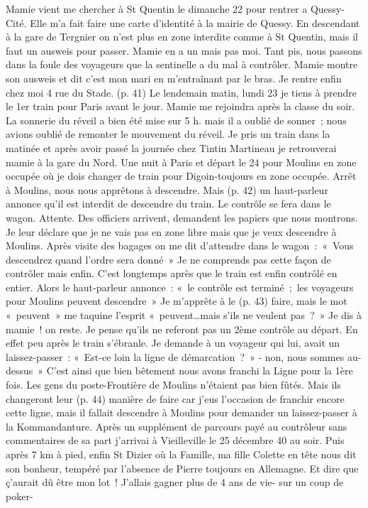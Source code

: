 \documentclass[a5paper,pagesize,10pt,bibtotoc,pointlessnumbers,
normalheadings,DIV=9,twoside=false]{scrbook}
\begin{document}
	Mamie vient me chercher à St Quentin le dimanche 22 pour rentrer a Quessy-Cité. Elle m’a fait faire une carte d’identité à la mairie de Quessy. En descendant à la gare de Tergnier on n’est plus en zone interdite comme à St Quentin, mais il faut un ausweis pour passer. Mamie en a un mais pas moi. Tant pis, nous passons dans la foule des voyageurs que la sentinelle a du mal à contrôler. Mamie montre son ausweis et dit c’est mon mari en m’entraînant par le bras. Je rentre enfin chez moi 4 rue du Stade.
	(p. 41) Le lendemain matin, lundi 23 je tiens à prendre le 1er train pour Paris avant le jour. Mamie me rejoindra après la classe du soir. La sonnerie du réveil a bien été mise sur 5 h. mais il a oublié de sonner ; nous avions oublié de remonter le mouvement du réveil. Je pris un train dans la matinée et après avoir passé la journée chez Tintin Martineau je retrouverai mamie à la gare du Nord. Une nuit à Paris et départ le 24 pour Moulins en zone occupée où je dois changer de train pour Digoin-toujours en zone occupée. Arrêt à Moulins, nous nous apprêtons à descendre. Mais (p. 42) un haut-parleur annonce qu’il est interdit de descendre du train. Le contrôle se fera dans le wagon. Attente. Des officiers arrivent, demandent les papiers que nous montrons. Je leur déclare que je ne vais pas en zone libre mais que je veux descendre à Moulins. Après visite des bagages on me dit d’attendre dans le wagon : « Vous descendrez quand l’ordre sera donné » Je ne comprends pas cette façon de contrôler mais enfin. C’est longtemps après que le train est enfin contrôlé en entier. Alors le haut-parleur annonce : « le contrôle est terminé ; les voyageurs pour Moulins peuvent descendre » Je m’apprête à le (p. 43) faire, mais le mot « peuvent » me taquine l’esprit « peuvent…mais s’ils ne veulent pas ? » Je dis à mamie ! on reste. Je pense qu’ils ne referont pas un 2ème contrôle au départ. En effet peu après le train s’ébranle. Je demande à un voyageur qui lui, avait un laissez-passer : « Est-ce loin la ligne de démarcation ? »
	- non, nous sommes au-dessus » C’est ainsi que bien bêtement nous avons franchi la Ligne pour la 1ère fois. Les gens du poste-Frontière de Moulins n’étaient pas bien fûtés. Mais ils changeront leur (p. 44) manière de faire car j’eus l’occasion de franchir encore cette ligne, mais il fallait descendre à Moulins pour demander un laissez-passer à la Kommandanture. Après un supplément de parcours payé au contrôleur sans commentaires de sa part j’arrivai à Vieilleville le 25 décembre 40 au soir. Puis après 7 km à pied, enfin St Dizier où la Famille, ma fille Colette en tête nous dit son bonheur, tempéré par l’absence de Pierre toujours en Allemagne. Et dire que ç’aurait dû être mon lot ! J’allais gagner plus de 4 ans de vie- sur un coup de poker-
\end{document}
